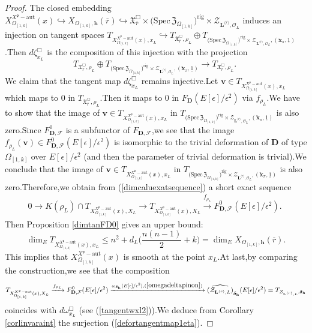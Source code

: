 \documentclass[SecEq,CM,GP]{degruyter-crelle} %
\theoremstyle{plain}
\newcommand{\Dpik}{{\mathbf{D}}}
\newcommand{\defvarrho}{{ X_{\omepik,\mathbf{{h}}}(\overline{r})}}
\newcommand{\lrr}{{\langle r\rangle}}
\newcommand{\omepik}{\Omega_{[1,k]}}
\newcommand{\rigch}{{\mathcal{Z}_{\bL^{\lrr},\mathcal{O}_L}}}
\newcommand{\rigchl}{{\mathcal{Z}_{\bL^{\lrr},L}}}
\newcommand{\sbanpik}{{\big(\mathrm{Spec}\hspace{2pt}\mathfrak{Z}_{\omepik}\big)^{\mathrm{rig}}}}
\newcommand{\xfpx}{X^{X^\fp-\mathrm{aut}}_{\omepik}(x)}
\newcommand{\bL}{{\mathbf{L}}}
\newcommand{\bv}{{\mathbf{v}}}
\newcommand{\bh}{{\mathbf{h}}}
\newcommand{\cF}{\mathcal F}
\newcommand{\cZ}{\mathcal Z}
\newcommand{\fp}{{\mathfrak{p}}}
\begin{document}
\begin{proof}
The closed embedding $\xfpx\hookrightarrow {\defvarrho}\hookrightarrow \mathfrak{X}_{\overline{r}}^\Box\times \sbanpik\times\rigch$ induces an injection on tangent spaces $T_{\xfpx,x_L}\hookrightarrow T_{\mathfrak{X}_{\overline{r}}^\Box,\rho_L}\oplus T_{\sbanpik\times\rigch,(\breve{\mathbf{{x}}}_\pi,\underline{1})}$.\;Then $d\zeta^{\Box}_{x_L}$ is the composition of this injection with the projection
$$T_{\mathfrak{X}_{\overline{r}}^\Box,\rho_L}\oplus T_{\sbanpik\times\rigch,(\breve{\mathbf{{x}}}_\pi,\underline{1})}\rightarrow T_{\mathfrak{X}_{\overline{r}}^\Box,\rho_L}.\;$$We claim that the tangent map $d\zeta^{\Box}_{x_L}$ remains injective.\;Let $\bv\in T_{\xfpx,x_L}$ which maps to $0$ in $T_{\mathfrak{X}_{\overline{r}}^\Box,\rho_L}$.\;Then it maps to $0$ in $F_{\Dpik}(E[\epsilon]/\epsilon^2)$ via $f_{\rho_L}$.\;We have to show that the image of $\bv\in T_{\xfpx,x_L}$ in $T_{\sbanpik\times\rigch,(\breve{\mathbf{{x}}}_\pi,\underline{1})}$ is also zero.\;Since $F_{\Dpik,\cF}^0$ is a subfunctor of $F_{\Dpik,\cF}$,\;we see that the image $f_{\rho_L}(\bv)\in F_{\Dpik,\cF}^0(E[\epsilon]/\epsilon^2)$ is isomorphic to the trivial deformation of $\Dpik$ of type $\omepik$ over $E[\epsilon]/\epsilon^2$ (and then the parameter of trivial deformation is trivial).\;We conclude that the image of $\bv\in T_{\xfpx,x_L}$ in $T_{\sbanpik\times\rigch,(\breve{\mathbf{{x}}}_\pi,\underline{1})}$ is also zero.\;Therefore,\;we obtain from (\ref{dimcaluexatsequence}) a short exact sequence
\begin{equation}\label{dimcaluexatsequenceproof}
	\begin{aligned}
		0\rightarrow K(\rho_L)\cap T_{\xfpx,X_L}\rightarrow T_{\xfpx,X_L}\xrightarrow{f_{\rho_L}} F_{\Dpik,\cF}^0(E[\epsilon]/\epsilon^2).\;
	\end{aligned}
\end{equation}
Then Proposition \ref{dimtanFD0} gives an upper bound:
\[\dim_ET_{\xfpx,x_L}\leq n^2+d_L\Big(\frac{n(n-1)}{2}+k\Big)=\dim_E{\defvarrho}.\]
This implies that $\xfpx$ is smooth at the point $x_L$.\;At last,\;by comparing the construction,\;we see that the composition
\begin{equation}
	\begin{aligned}
		T_{\xfpx,X_L}\xrightarrow{f_{\rho_L}} F_{\Dpik,\cF}^0(E[\epsilon]/\epsilon^2)\xrightarrow{\omega_{\bm{\delta}_{\bh}}(E[\epsilon]/\epsilon^2),(\ref{omegadeltapinon})}\widehat{(\cZ_{\bL^{\lrr},L})}_{\bm{\delta}_{\bh}}(E[\epsilon]/\epsilon^2)=T_{\rigchl,\bm{\delta}_{\bh}}
	\end{aligned}
\end{equation}
coincides with $d\omega_{x_L}^\Box$ (see (\ref{tangentwxl2})).\;We deduce from Corollary \ref{corlinvaraint} the surjection (\ref{defortangentmap1eta}).\;	
\end{proof}
\end{document}
